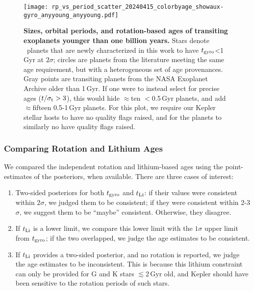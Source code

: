 \documentclass[11pt,twocolumn,tighten]{aastex63}
\begin{document}
\begin{figure}[!t]
  \begin{center}
    \texttt{[image: rp\_vs\_period\_scatter\_20240415\_colorbyage\_showaux-gyro\_anyyoung\_anyyoung.pdf]}
  \end{center}
  \vspace{-0.5cm}
  \caption{
    {\bf Sizes, orbital periods, and rotation-based ages of transiting
    exoplanets younger than one billion years.} Stars denote
    \nplyounggyrotwosigmanograzingnoruwe\ planets that are newly
    characterized in this work to have $t_{\rm gyro}$<1\,Gyr at
    $2$$\sigma$; circles are planets from the literature meeting the
    same age requirement, but with a heterogeneous set of age
    provenances.  Gray points are transiting planets from the NASA
    Exoplanet Archive older than 1\,Gyr.  If one were to instead
    select for precise ages ($t/\sigma_{\rm t}>3$), this would hide
    $\approx$ten $<$0.5\,Gyr planets, and add $\approx$fifteen
    0.5-1\,Gyr planets.  For this plot, we require our Kepler stellar
    hosts to have no quality flags raised, and for the planets to
    similarly no have quality flags raised. 
    \label{fig:rp_period_age_results}
  }
\end{figure}

\subsubsection{Comparing Rotation and Lithium Ages}

We compared the independent rotation and lithium-based ages using the
point-estimates of the posteriors, when available.  There are three
cases of interest:

\begin{enumerate}[leftmargin=*,topsep=0pt,itemsep=-1ex,partopsep=1ex,parsep=1ex]
  \item Two-sided posteriors for both $t_{\rm gyro}$ and $t_{\rm Li}$:
    if their values were consistent within 2$\sigma$, we judged them
    to be consistent; if they were consistent within 2-3$\sigma$, we
    suggest them to be ``maybe'' consistent.  Otherwise, they
    disagree.
  \item If $t_{\rm Li}$ is a lower limit, we compare this lower limit
    with the $1\sigma$ upper limit from $t_{\rm gyro}$; if the two
    overlapped, we judge the age estimates to be consistent.
  \item If $t_{\rm Li}$ provides a two-sided posterior, and no
    rotation is reported, we judge the age estimates to be
    inconsistent.  This is because this lithium constraint can only be
    provided for G and K stars $\lesssim$2\,Gyr old, and Kepler should
    have been sensitive to the rotation periods of such stars.
\end{enumerate}
\end{document}
